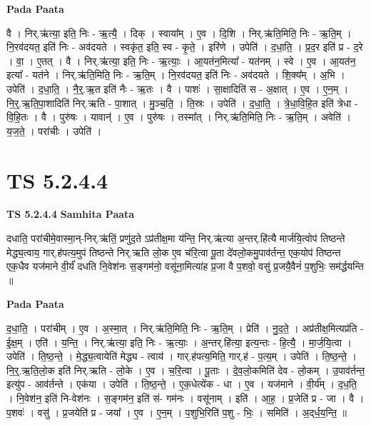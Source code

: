 \documentclass[17pt]{extarticle}
\begin{document}
\textbf{Pada Paata} \newline

वै । निर्.ऋ॑त्या॒ इति॒ निः - ऋ॒त्यै॒ । दिक् । स्वाया᳚म् । ए॒व । दि॒शि । निर्.ऋ॑ति॒मिति॒ निः - ऋ॒ति॒म् । नि॒रव॑दयत॒ इति॑ निः - अव॑दयते । स्वकृ॑त॒ इति॒ स्व - कृ॒ते॒ । इरि॑णे । उपेति॑ । द॒धा॒ति॒ । प्र॒द॒र इति॑ प्र - द॒रे । वा॒ । ए॒तत् । वै । निर्.ऋ॑त्या॒ इति॒ निः - ऋ॒त्याः॒ । आ॒यत॑न॒मित्या᳚ - यत॑नम् । स्वे । ए॒व । आ॒यत॑न॒ इत्या᳚ - यत॑ने । निर्.ऋ॑ति॒मिति॒ निः - ऋ॒ति॒म् । नि॒रव॑दयत॒ इति॑ निः - अव॑दयते । शि॒क्य᳚म् । अ॒भि । उपेति॑ । द॒धा॒ति॒ । नै॒र्॒.ऋ॒त इति॑ नैः - ऋ॒तः । वै । पाशः॑ । सा॒क्षादिति॑ स - अ॒क्षात् । ए॒व । ए॒न॒म् । नि॒र्॒.ऋ॒ति॒पा॒शादिति॑ निर्.ऋति - पा॒शात् । मु॒ञ्च॒ति॒ । ति॒स्रः । उपेति॑ । द॒धा॒ति॒ । त्रे॒धा॒वि॒हि॒त इति॑ त्रेधा - वि॒हि॒तः । वै । पुरु॑षः । यावान्॑ । ए॒व । पुरु॑षः । तस्मा᳚त् । निर्.ऋ॑ति॒मिति॒ निः - ऋ॒ति॒म् । अवेति॑ । य॒ज॒ते॒ । परा॑चीः । उपेति॑ ।  \newline





\section{ TS 5.2.4.4 }

\textbf{TS 5.2.4.4 } \newline
\textbf{Samhita Paata} \newline

दधाति॒ परा॑चीमे॒वास्मा॒न्-निर्.ऋ॑तिं॒ प्रणु॑द॒ते ऽप्र॑तीक्ष॒मा य॑न्ति॒ निर्.ऋ॑त्या अ॒न्तर्.हि॑त्यै मार्जयि॒त्वोप॑ तिष्ठन्ते मेद्ध्य॒त्वाय॒ गार्.ह॑पत्य॒मुप॑ तिष्ठन्ते निर्.ऋति लो॒क ए॒व च॑रि॒त्वा पू॒ता दे॑वलो॒कमु॒पाव॑र्तन्त॒ एक॒योप॑ तिष्ठन्त एक॒धैव यज॑माने वी॒र्यं॑ दधति नि॒वेश॑नः स॒ङ्गम॑नो॒ वसू॑ना॒मित्या॑ह प्र॒जा वै प॒शवो॒ वसु॑ प्र॒जयै॒वैनं॑ प॒शुभिः॒ सम॑र्द्धयन्ति ॥ \newline

\textbf{Pada Paata} \newline

द॒धा॒ति॒ । परा॑चीम् । ए॒व । अ॒स्मा॒त् । निर्.ऋ॑ति॒मिति॒ निः - ऋ॒ति॒म् । प्रेति॑ । नु॒द॒ते॒ । अप्र॑तीक्ष॒मित्यप्र॑ति - ई॒क्ष॒म् । एति॑ । य॒न्ति॒ । निर्.ऋ॑त्या॒ इति॒ निः - ऋ॒त्याः॒ । अ॒न्तर्.हि॑त्या॒ इत्य॒न्तः - हि॒त्यै॒ । मा॒र्ज॒यि॒त्वा । उपेति॑ । ति॒ष्ठ॒न्ते॒ । मे॒द्ध्य॒त्वायेति॑ मेद्ध्य - त्वाय॑ । गार्.ह॑पत्य॒मिति॒ गार्.ह॑ - प॒त्य॒म् । उपेति॑ । ति॒ष्ठ॒न्ते॒ । नि॒र्॒.ऋ॒ति॒लो॒क इति॑ निर्.ऋति - लो॒के । ए॒व । च॒रि॒त्वा । पू॒ताः । दे॒व॒लो॒कमिति॑ देव -  लो॒कम् । उ॒पाव॑र्तन्त॒ इत्यु॑प - आव॑र्तन्ते । एक॑या । उपेति॑ । ति॒ष्ठ॒न्ते॒ । ए॒क॒धेत्ये॑क - धा । ए॒व । यज॑माने । वी॒र्य᳚म् । द॒ध॒ति॒ । नि॒वेश॑न॒ इति॑ नि-वेश॑नः । स॒ङ्गम॑न॒ इति॑ सं- गम॑नः । वसू॑नाम् । इति॑ । आ॒ह॒ । प्र॒जेति॑ प्र - जा । वै ।   प॒शवः॑ । वसु॑ । प्र॒जयेति॑ प्र - जया᳚ । ए॒व । ए॒न॒म् । प॒शुभि॒रिति॑ प॒शु - भिः॒ । समिति॑ । अ॒द्‌र्ध॒य॒न्ति॒ ॥  \newline
\end{document}
